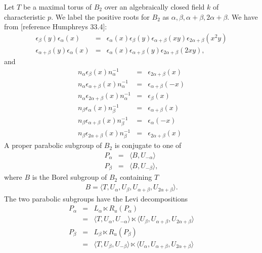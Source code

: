 Let $T$ be a maximal torus of $B_2$ over an algebraically closed field $k$ of characteristic $p$. We label the positive roots for $B_2$ as $\alpha, \beta, \alpha + \beta, 2\alpha + \beta$. We have from [reference Humphreys 33.4]:
\begin{eqnarray*}
\epsilon_\beta (y) \epsilon_\alpha (x) &=& \epsilon_\alpha (x) \epsilon_\beta (y) \epsilon_{\alpha + \beta} (xy) \epsilon_{2\alpha+\beta} (x^2y) \\
\epsilon_{\alpha + \beta} (y) \epsilon_\alpha (x) &=& \epsilon_\alpha (x) \epsilon_{\alpha + \beta} (y) \epsilon_{2\alpha + \beta} (2xy),
\end{eqnarray*}
and 
\begin{eqnarray*}
n_\alpha \epsilon_\beta(x) n_\alpha^{-1} &=& \epsilon_{2\alpha+\beta}(x)\\
n_\alpha \epsilon_{\alpha+\beta}(x) n_\alpha^{-1} &=& \epsilon_{\alpha+\beta}(-x)\\
n_\alpha \epsilon_{2\alpha+\beta}(x) n_\alpha^{-1} &=& \epsilon_{\beta}(x)\\
n_\beta \epsilon_\alpha(x) n_\beta^{-1} &=& \epsilon_{\alpha+\beta}(x)\\
n_\beta \epsilon_{\alpha+\beta}(x) n_\beta^{-1} &=& \epsilon_{\alpha}(-x)\\
n_\beta \epsilon_{2\alpha+\beta}(x) n_\beta^{-1} &=& \epsilon_{2\alpha+\beta}(x)
\end{eqnarray*}
A proper parabolic subgroup of $B_2$ is conjugate to one of
\begin{eqnarray*}
P_\alpha &=& \langle B, U_{-\alpha} \rangle\\
P_\beta &=& \langle B, U_{-\beta} \rangle,
\end{eqnarray*}
where $B$ is the Borel subgroup of $B_2$ containing $T$
\begin{eqnarray*}
B=\langle T, U_\alpha, U_\beta, U_{\alpha + \beta}, U_{2\alpha+\beta}\rangle.
\end{eqnarray*}
The two parabolic subgroups have the Levi decompositions
\begin{eqnarray*}
P_\alpha &=& L_\alpha \ltimes R_u(P_\alpha) \\
&=& \langle T, U_\alpha, U_{-\alpha} \rangle \ltimes \langle U_\beta, U_{\alpha + \beta}, U_{2\alpha + \beta} \rangle \\
P_\beta &=& L_\beta \ltimes R_u(P_\beta) \\
&=& \langle T, U_\beta, U_{-\beta} \rangle \ltimes \langle U_\alpha, U_{\alpha+\beta}, U_{2\alpha + \beta} \rangle
\end{eqnarray*}

